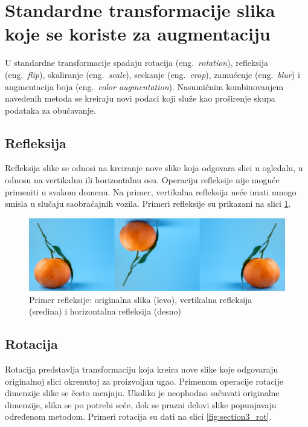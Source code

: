 \documentclass[12pt,oneside]{memoir}
\begin{document}
\section{Standardne transformacije slika koje se koriste za augmentaciju}
\label{section3_increasedata_bas}
U standardne transformacije spadaju rotacija (eng.~\textit{rotation}), refleksija (eng.~\textit{flip}), skaliranje (eng.~\textit{scale}), seckanje (eng.~\textit{crop}), zamućenje (eng.~\textit{blur}) i augmentacija boja (eng.~\textit{color augmentation}).
Nasumičnim kombinovanjem navedenih metoda se kreiraju novi podaci koji služe kao proširenje skupa podataka za obučavanje.

\subsection{Refleksija}
Refleksija slike se odnosi na kreiranje nove slike koja odgovara slici u ogledalu, u odnosu na vertikalnu ili horizontalnu osu. Operaciju refleksije nije moguće primeniti u svakom domenu. Na primer, vertikalna refleksija neće imati mnogo smisla u slučaju saobraćajnih vozila. Primeri refleksije su prikazani na slici \ref{fig:section3_flip}. 

\begin{figure}[ht]
    \centering
    \includegraphics[width=1\textwidth]{matfmaster/glava3/flip.jpg}
    \caption{Primer refleksije: originalna slika (levo), vertikalna refleksija (sredina) i horizontalna refleksija (desno) \cite{unsplashOrange}}
    \label{fig:section3_flip}
\end{figure}

\subsection{Rotacija}
Rotacija predstavlja transformaciju koja kreira nove slike koje odgovaraju originalnoj slici okrenutoj za proizvoljan ugao. Primenom operacije rotacije dimenzije slike se često menjaju. Ukoliko je neophodno sačuvati originalne dimenzije, slika se po potrebi seče, dok se prazni delovi slike popunjavaju određenom metodom. Primeri rotacija su dati na slici \ref{fig:section3_rot}. 
\end{document}
